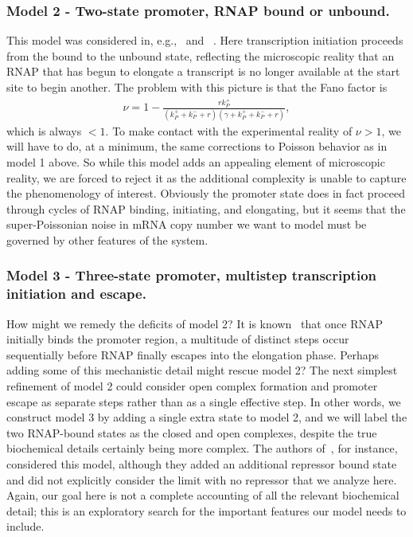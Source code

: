 \documentclass[12pt]{article}%
\newcommand{\rate}[3]{{#1}_{#2}^{#3}}
\begin{document}
\subsubsection{Model 2 - Two-state promoter, RNAP bound or unbound.}
This model was considered in, e.g.,~\cite{Phillips2015a} and ~\cite{Phillips2019}.
Here transcription initiation proceeds from the bound to the unbound state,
reflecting the microscopic reality that an RNAP that has begun to elongate
a transcript is no longer available at the start site to begin another.
The problem with this picture is that the Fano factor is
\begin{align}
    \nu = 1 -
        \frac{r\rate{k}{P}{+}}
            {\left(\rate{k}{P}{+} + \rate{k}{P}{-} + r\right)
             \left(\gamma + \rate{k}{P}{+} + \rate{k}{P}{-} + r\right)},
\end{align}
which is always $<1$.
To make contact with the experimental reality of $\nu>1$,
we will have to do, at a minimum,
the same corrections to Poisson behavior as in model 1 above.
So while this model adds an appealing element of microscopic
reality, we are forced to reject it as the additional complexity
is unable to capture the phenomenology of interest.
Obviously the promoter state does in fact proceed through cycles
of RNAP binding, initiating, and elongating, but it seems that
the super-Poissonian noise in mRNA copy number we want to
model must be governed by other features of the system.

\subsubsection{Model 3 - Three-state promoter, multistep
transcription initiation and escape.}
How might we remedy the deficits of model 2?
It is known~\cite{DeHaseth1998} that once RNAP initially binds
the promoter region, a multitude of distinct steps occur
sequentially before RNAP finally escapes into the elongation
phase. Perhaps adding some of this mechanistic detail might
rescue model 2? The next simplest refinement of model 2 could
consider open complex formation and promoter escape as separate
steps rather than as a single effective step. In other words, we
construct model 3 by adding a single extra state to model 2, and
we will label the two RNAP-bound states as the closed and open
complexes, despite the true biochemical details certainly being
more complex. The authors of~\cite{Mitarai2015}, for instance,
considered this model, although they added an additional
repressor bound state and did not explicitly consider the limit
with no repressor that we analyze here. Again, our goal here is
not a complete accounting of all the relevant biochemical detail;
this is an exploratory search for the important features our
model needs to include.
\end{document}
